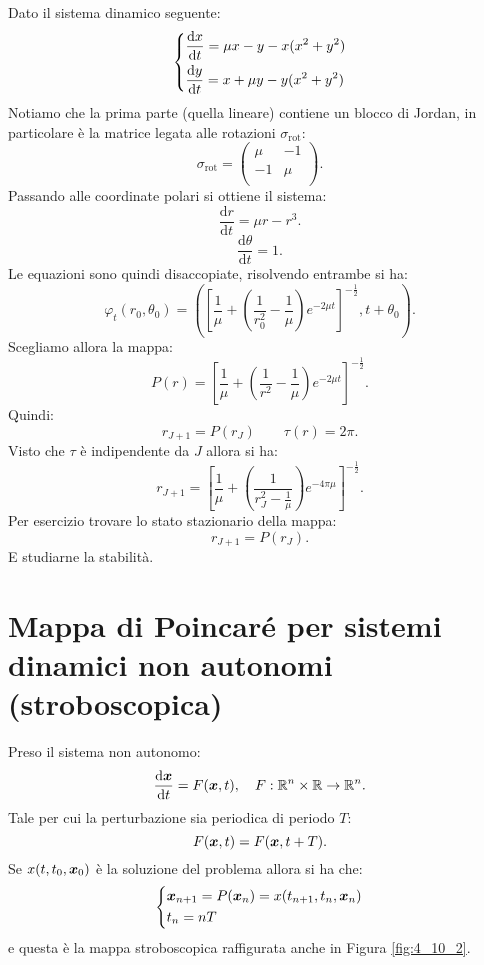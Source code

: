 \begin{exmp}[]
    Dato il sistema dinamico seguente:
    \[
    \begin{dcases}
	\frac{\text{d} x}{\text{d} t} = \mu x-y-x(x^2+y^2) \\
	\frac{\text{d} y}{\text{d} t} = x + \mu y - y(x^2+y^2) 
    \end{dcases}
    \]
    Notiamo che la prima parte (quella lineare) contiene un blocco di Jordan, in particolare è la matrice legata alle rotazioni $\sigma_{\text{rot}}$:
    \[
        \sigma_{\text{rot}} = 
	\begin{pmatrix}
	    \mu & -1 \\
	    -1 & \mu \\
	\end{pmatrix}
    .\] 
    Passando alle coordinate polari si ottiene il sistema:
    \[
        \frac{\text{d} r}{\text{d} t} = \mu r-r^3
    .\] 
    \[
        \frac{\text{d} \theta}{\text{d} t} = 1
    .\] 
    Le equazioni sono quindi disaccopiate, risolvendo entrambe si ha:
    \[
	\varphi_t(r_0,\theta_0) = \left(\left[\frac{1}{\mu} + \left(\frac{1}{r_0^2}-\frac{1}{\mu}\right)e^{-2\mu t}\right]^{-\frac{1}{2}}, t + \theta_0\right)
    .\] 
    Scegliamo allora la mappa:
    \[
	P(r) = \left[\frac{1}{\mu}+\left(\frac{1}{r^2}-\frac{1}{\mu}\right)e^{-2\mu t}\right]^{-\frac{1}{2}}
    .\] 
    Quindi:
    \[
	r_{J+1}= P(r_{J}) \qquad  \tau (r) = 2\pi
    .\] 
    Visto che $\tau$ è indipendente da $J$ allora si ha:
    \[
        r_{J+1}=\left[\frac{1}{\mu}+ \left(\frac{1}{r_J^2 - \frac{1}{\mu}}\right)e^{-4\pi\mu}\right]^{-\frac{1}{2}}
    .\] 
    Per esercizio trovare lo stato stazionario della mappa:
    \[
	r_{J+1}= P(r_J) 
    .\] E studiarne la stabilità.
\end{exmp}
\noindent
\section*{Mappa di Poincaré per sistemi dinamici non autonomi (stroboscopica)}%
Preso il sistema non autonomo:
\[
    \frac{\text{d} \boldsymbol{x}}{\text{d} t} = F(\boldsymbol{x}, t), \quad  F: \mathbb{R}^n\times \mathbb{R}\to \mathbb{R}^n
.\] 
Tale per cui la perturbazione sia periodica di periodo $T$:
\[
    F(\boldsymbol{x}, t) = F(\boldsymbol{x}, t + T) 
.\] 
Se $x(t, t_0, \boldsymbol{x}_0)$ è la soluzione del problema allora si ha che:
\[
\begin{dcases}
    \boldsymbol{x}_{n+1}= P(\boldsymbol{x}_n) = x(t_{n+1}, t_n, \boldsymbol{x}_n)\\
    t_n = nT
\end{dcases}
\]
e questa è la mappa stroboscopica raffigurata anche in Figura \ref{fig:4_10_2}.

